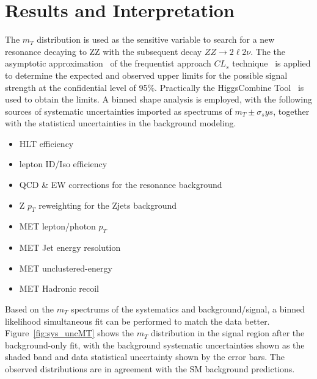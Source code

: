 \section{Results and Interpretation}
The $m_T$ distribution is used as the sensitive variable to search for a new resonance decaying to ZZ with the subsequent decay $ZZ\rightarrow 2\ell 2\nu$. The the asymptotic approximation~\cite{sys_cls0} of the frequentist approach $CL_s$ technique~\cite{sys_cls1,sys_cls2,sys_cls3} is applied to determine the expected and observed upper limits for the possible signal strength at the confidential level of 95\%. Practically the HiggsCombine Tool~\cite{sys_higgscombinetool} is used to obtain the limits. A binned shape analysis is employed, with the following sources of systematic uncertainties imported as spectrums of $m_T\pm \sigma_sys$, together with the statistical uncertainties in the background modeling.
\begin{itemize}
\item HLT efficiency
\item lepton ID/Iso efficiency
\item QCD \& EW corrections for the resonance background
\item Z $p_T$ reweighting for the Zjets background
\item MET lepton/photon $p_T$
\item MET Jet energy resolution
\item MET unclustered-energy
\item MET Hadronic recoil 
\end{itemize}

Based on the $m_T$ spectrums of the systematics and background/signal, a binned likelihood simultaneous fit can be performed to match the data better. Figure~\ref{fig:sys_uncMT} shows the $m_T$ distribution in the signal region after the background-only fit, with the background systematic uncertainties shown as the shaded band and data statistical uncertainty shown by the error bars. The observed distributions are in agreement with the SM background predictions.

